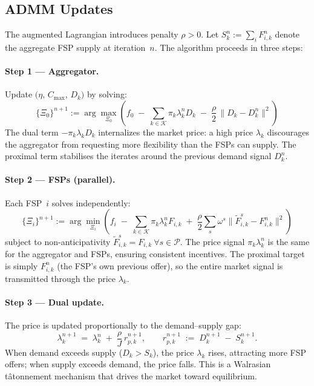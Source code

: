 \subsection*{ADMM Updates}

The augmented Lagrangian introduces penalty $\rho > 0$.
Let $S_k^n := \sum_i F_{i,k}^n$ denote the aggregate FSP supply at iteration~$n$.
The algorithm proceeds in three steps:

\paragraph{Step 1 — Aggregator.}
Update $\bigl(\eta,\,C_{\max},\,D_k\bigr)$ by solving:
\begin{equation}
\label{eq:agg_update}
  \{\Xi_0\}^{n+1} :=
    \arg\max_{\Xi_0}
    \left(
      f_0
      \;-\; \sum_{k \in \mathcal{K}} \pi_k \lambda_k^n D_k
      \;-\; \frac{\rho}{2}\,\bigl\|D_k - D_k^{n}\bigr\|^2
    \right)
\end{equation}
The dual term $-\pi_k \lambda_k D_k$ internalizes the market price: a high price $\lambda_k$ discourages the aggregator from requesting more flexibility than the FSPs can supply. The proximal term stabilises the iterates around the previous demand signal $D_k^n$.

\paragraph{Step 2 — FSPs (parallel).}
Each FSP~$i$ solves independently:
\begin{equation}
\label{eq:fsp_update}
  \{\Xi_i\}^{n+1} :=
    \arg\min_{\Xi_i}
    \left(
      f_i
      \;-\; \sum_{k \in \mathcal{K}} \pi_k\lambda_k^n F_{i,k}
      \;+\; \frac{\rho}{2}\sum_{s}\omega^s
            \bigl\|\tilde{F}_{i,k}^s - F_{i,k}^{n}\bigr\|^2
    \right)
\end{equation}
subject to non-anticipativity $\tilde{F}_{i,k}^s = F_{i,k}\ \forall s \in \mathcal{P}$.
The price signal $\pi_k \lambda_k^n$ is the same for the aggregator and FSPs, ensuring consistent incentives. The proximal target is simply $F_{i,k}^n$ (the FSP's own previous offer), so the entire market signal is transmitted through the price $\lambda_k$.

\paragraph{Step 3 — Dual update.}
The price is updated proportionally to the demand–supply gap:
\begin{equation}
\label{eq:dual_update}
  \lambda_k^{n+1} \;=\; \lambda_k^n \;+\; \frac{\rho}{J}\,r_{p,k}^{n+1},
  \qquad
  r_{p,k}^{n+1} \;:=\; D_k^{n+1} \;-\; S_k^{n+1}.
\end{equation}
When demand exceeds supply ($D_k > S_k$), the price $\lambda_k$ rises, attracting more FSP offers; when supply exceeds demand, the price falls. This is a Walrasian t\^{a}tonnement mechanism that drives the market toward equilibrium.


